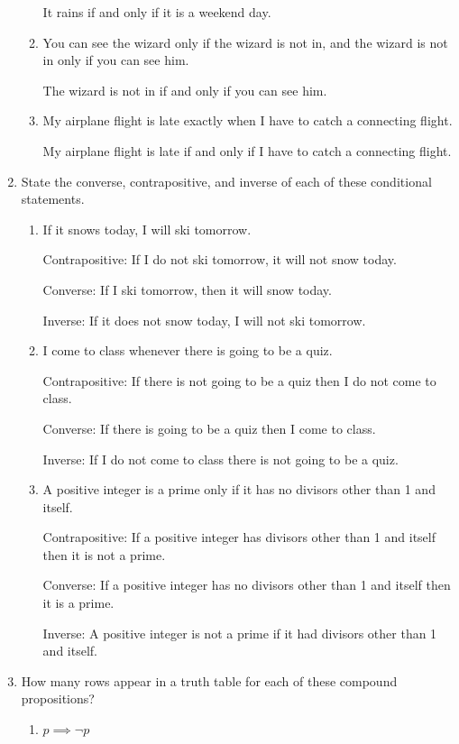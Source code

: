\documentclass[11pt]{article}
\begin{document}
\begin{enumerate}[label=\textbf{\arabic*.}]
\begin{enumerate}[label=\textbf{\alph*)}]
		It rains if and only if it is a weekend day.
		
		\item You can see the wizard only if the wizard is not in, and the wizard is not in only if you can see him.
		
		The wizard is not in if and only if you can see him.
		
		\item My airplane flight is late exactly when I have to catch a connecting flight.
		
		My airplane flight is late if and only if I have to catch a connecting flight.
	\end{enumerate}

	\item State the converse, contrapositive, and inverse of each of these conditional statements.
	\begin{enumerate}[label=\textbf{\alph*)}]
		\item If it snows today, I will ski tomorrow.
		
		Contrapositive: If I do not ski tomorrow, it will not snow today.
		
		Converse: If I ski tomorrow, then it will snow today.
		
		Inverse: If it does not snow today, I will not ski tomorrow.
		
		\item I come to class whenever there is going to be a quiz.
		
		Contrapositive: If there is not going to be a quiz then I do not come to class.
		
		Converse: If there is going to be a quiz then I come to class.
		
		Inverse: If I do not come to class there is not going to be a quiz.
		
		\item A positive integer is a prime only if it has no divisors other than 1 and itself.
		
		Contrapositive: If a positive integer has divisors other than 1 and itself then it is not a prime.
		
		Converse: If a positive integer has no divisors other than 1 and itself then it is a prime.
		
		Inverse: A positive integer is not a prime if it had divisors other than 1 and itself.
	\end{enumerate}

	\item How many rows appear in a truth table for each of these compound propositions?
	\begin{enumerate}[label=\textbf{\alph*)}]
		\item $p \implies \neg p$
		

\end{enumerate}
\end{enumerate}
\end{document}
